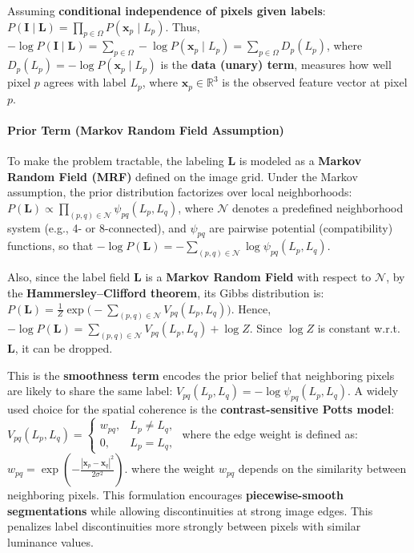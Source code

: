 \documentclass[11pt]{article}
\begin{document}
Assuming \textbf{conditional independence of pixels given labels}:
\(P(\mathbf{I}\mid\mathbf{L}) = \prod\limits_{p\in\Omega} P(\mathbf{x}_p \mid L_p)\).
Thus,
\(-\log P(\mathbf{I}\mid\mathbf{L}) = \sum\limits_{p\in\Omega} -\log P(\mathbf{x}_p \mid L_p) = \sum\limits_{p\in\Omega} D_p(L_p)\),
where \(\boxed{D_p(L_p) = -\log P(\mathbf{x}_p \mid L_p)}\) is the
\textbf{data (unary) term}, measures how well pixel \(p\) agrees with
label \(L_p\), where \(\mathbf{x}_p \in \mathbb{R}^3\) is the observed
feature vector at pixel \(p\).

\hypertarget{prior-term-markov-random-field-assumption}{%
\paragraph{\texorpdfstring{\textbf{Prior Term (Markov Random Field
Assumption)}}{Prior Term (Markov Random Field Assumption)}}\label{prior-term-markov-random-field-assumption}}

To make the problem tractable, the labeling \(\mathbf{L}\) is modeled as
a \textbf{Markov Random Field (MRF)} defined on the image grid. Under
the Markov assumption, the prior distribution factorizes over local
neighborhoods:
\(P(\mathbf{L}) \propto \prod\limits_{(p,q)\in\mathcal{N}} \psi_{pq}(L_p, L_q)\),
where \(\mathcal{N}\) denotes a predefined neighborhood system (e.g., 4-
or 8-connected), and \(\psi_{pq}\) are pairwise potential
(compatibility) functions, so that
\(-\log P(\mathbf{L}) = -\sum\limits_{(p,q)\in\mathcal{N}} \log \psi_{pq}(L_p, L_q)\).

Also, since the label field \(\mathbf{L}\) is a \textbf{Markov Random
Field} with respect to \(\mathcal{N}\), by the
\textbf{Hammersley--Clifford theorem}, its Gibbs distribution is:
\(P(\mathbf{L})=\frac{1}{Z}\exp\Big(-\sum\limits_{(p,q)\in\mathcal{N}} V_{pq}(L_p,L_q)\Big)\).
Hence,
\(-\log P(\mathbf{L}) = \sum\limits_{(p,q)\in\mathcal{N}} V_{pq}(L_p,L_q) + \log Z\).
Since \(\log Z\) is constant w.r.t. \(\mathbf{L}\), it can be dropped.

This is the \textbf{smoothness term} encodes the prior belief that
neighboring pixels are likely to share the same label:
\(\boxed{V_{pq}(L_p, L_q) = -\log \psi_{pq}(L_p, L_q)}\). A widely used
choice for the spatial coherence is the \textbf{contrast-sensitive Potts
model}:
\(V_{pq}(L_p,L_q) = \begin{cases} w_{pq}, & L_p \neq L_q, \\ 0, & L_p = L_q, \end{cases}\)
where the edge weight is defined as:
\(w_{pq} = \exp\left( -\frac{|\mathbf{x}_p - \mathbf{x}_q|^2}{2\sigma^2} \right)\).
where the weight \(w_{pq}\) depends on the similarity between
neighboring pixels. This formulation encourages \textbf{piecewise-smooth
segmentations} while allowing discontinuities at strong image edges.
This penalizes label discontinuities more strongly between pixels with
similar luminance values.
\end{document}
